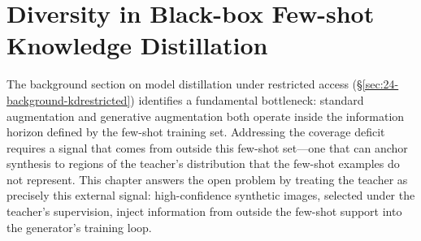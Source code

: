 \acresetall

\chapter[Diversity in Black-box Few-shot Knowledge Distillation]{Diversity in Black-box Few-shot \\ Knowledge Distillation} \label{ch:30-research01}

\begin{foldable}
  The background section on model distillation under restricted access (\S\ref{sec:24-background-kdrestricted}) identifies a fundamental bottleneck: standard augmentation and generative augmentation both operate inside the information horizon defined by the few-shot training set.
  Addressing the coverage deficit requires a signal that comes from outside this few-shot set---one that can anchor synthesis to regions of the teacher's distribution that the few-shot examples do not represent.
  This chapter answers the open problem by treating the teacher as precisely this external signal: high-confidence synthetic images, selected under the teacher's supervision, inject information from outside the few-shot support into the generator's training loop.
\end{foldable}





